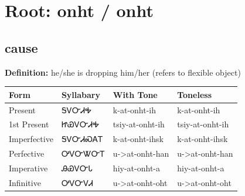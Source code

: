 \documentclass{article}%
\begin{document}
%
\normalsize%
\section*{Root: onht / onht}%
\subsection*{cause}%
\textbf{Definition: }%
he/she is dropping him/her (refers to flexible object)%
\\[0.5em]%
\begin{tabular}{|l|l|l|l|}%
\hline%
\textbf{Form}&\textbf{Syllabary}&\textbf{With Tone}&\textbf{Toneless}\\%
\hline%
Present&ᎦᏙᏅᏗᎭ&k{-}at{-}onht{-}ih&k{-}at{-}onht{-}ih\\%
1st Present&ᏥᏯᏙᏅᏗᎭ&tsiy{-}at{-}onht{-}ih&tsiy{-}at{-}onht{-}ih\\%
Imperfective&ᎦᏙᏅᏗᏍᎪᎢ&k{-}at{-}onht{-}ihsk&k{-}at{-}onht{-}ihsk\\%
Perfective&ᎤᏙᏅᏔᏅᎢ&u{-}>at{-}onht{-}han&u{-}>at{-}onht{-}han\\%
Imperative&ᎯᏯᏙᏅᏓ&hiy{-}at{-}onht{-}a&hiy{-}at{-}onht{-}a\\%
Infinitive&ᎤᏙᏅᏙᏗ&u{-}>at{-}onht{-}oht&u{-}>at{-}onht{-}oht\\%
\hline%
\end{tabular}%
\\[1em]%
\end{document}

